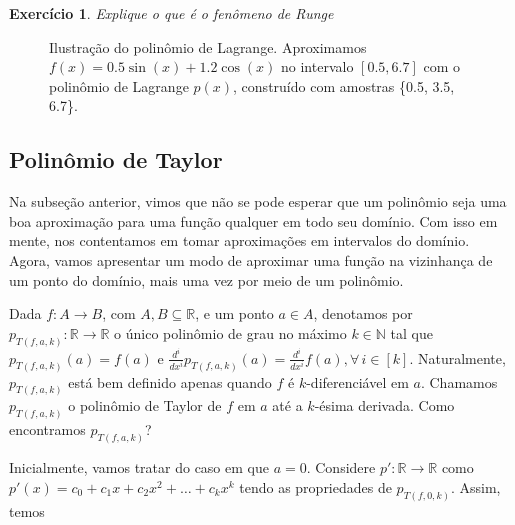 \documentclass[]{article}
\newtheorem{exercicio}{Exercício}
\numberwithin{equation}{section}
\begin{document}
\begin{exercicio} \label{exercicioFenomenoRunge}
	Explique o que é o \emph{fenômeno de Runge}
\end{exercicio}

\begin{figure}
  \centering
  \caption{Ilustração do polinômio de Lagrange. Aproximamos
    $f(x) = 0.5\sin(x) + 1.2\cos(x)$ no intervalo $[0.5, 6.7]$ com o
    polinômio de Lagrange $p(x)$, construído com amostras \{0.5, 3.5,
    6.7\}.}
\end{figure}

\subsection{Polinômio de Taylor}

Na subseção anterior, vimos que não se pode esperar que um polinômio
seja uma boa aproximação para uma função qualquer em todo seu
domínio. Com isso em mente, nos contentamos em tomar aproximações em
intervalos do domínio. Agora, vamos apresentar um modo de aproximar
uma função na vizinhança de um ponto do domínio, mais uma vez por meio
de um polinômio.

Dada $f : A \to B$, com $A, B \subseteq \mathbb{R}$, e um ponto
$a \in A$, denotamos por $p_{T(f, a, k)} : \mathbb{R} \to \mathbb{R}$
o único polinômio de grau no máximo $k \in \mathbb{N}$ tal que
$p_{T(f, a, k)}(a) = f(a)$ e
$\frac{d^i}{dx^i} p_{T(f, a, k)}(a) = \frac{d^i}{dx^i} f(a), \forall\,
i \in [k]$. Naturalmente, $p_{T(f, a, k)}$ está bem definido apenas
quando $f$ é $k$-diferenciável em $a$. Chamamos $p_{T(f, a, k)}$ o
polinômio de Taylor de $f$ em $a$ até a $k$-ésima derivada. Como
encontramos $p_{T(f, a, k)}$?

Inicialmente, vamos tratar do caso em que $a = 0$. Considere
$p' : \mathbb{R} \to \mathbb{R}$ como
$p'(x) = c_0 + c_1x + c_2x^2 + \dots + c_kx^k$ tendo as propriedades
de $p_{T(f, 0, k)}$. Assim, temos
\end{document}

